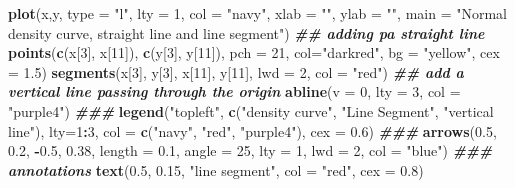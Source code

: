 \documentclass[
]{book}
\newenvironment{Shaded}{\begin{snugshade}}{\end{snugshade}}
\newcommand{\AttributeTok}[1]{\textcolor[rgb]{0.13,0.29,0.53}{#1}}
\newcommand{\DecValTok}[1]{\textcolor[rgb]{0.00,0.00,0.81}{#1}}
\newcommand{\DocumentationTok}[1]{\textcolor[rgb]{0.56,0.35,0.01}{\textbf{\textit{#1}}}}
\newcommand{\FloatTok}[1]{\textcolor[rgb]{0.00,0.00,0.81}{#1}}
\newcommand{\FunctionTok}[1]{\textcolor[rgb]{0.13,0.29,0.53}{\textbf{#1}}}
\newcommand{\NormalTok}[1]{#1}
\newcommand{\SpecialCharTok}[1]{\textcolor[rgb]{0.81,0.36,0.00}{\textbf{#1}}}
\newcommand{\StringTok}[1]{\textcolor[rgb]{0.31,0.60,0.02}{#1}}
\begin{document}
\begin{Shaded}
\begin{Highlighting}[]
\FunctionTok{plot}\NormalTok{(x,y, }\AttributeTok{type =} \StringTok{"l"}\NormalTok{, }\AttributeTok{lty =} \DecValTok{1}\NormalTok{, }\AttributeTok{col =} \StringTok{"navy"}\NormalTok{, }\AttributeTok{xlab =} \StringTok{""}\NormalTok{, }\AttributeTok{ylab =} \StringTok{""}\NormalTok{,}
     \AttributeTok{main =} \StringTok{"Normal density curve, straight line and line segment"}\NormalTok{)}
\DocumentationTok{\#\# adding pa straight line}
\FunctionTok{points}\NormalTok{(}\FunctionTok{c}\NormalTok{(x[}\DecValTok{3}\NormalTok{], x[}\DecValTok{11}\NormalTok{]), }\FunctionTok{c}\NormalTok{(y[}\DecValTok{3}\NormalTok{], y[}\DecValTok{11}\NormalTok{]), }\AttributeTok{pch =} \DecValTok{21}\NormalTok{, }\AttributeTok{col=}\StringTok{"darkred"}\NormalTok{, }\AttributeTok{bg =} \StringTok{"yellow"}\NormalTok{, }\AttributeTok{cex =} \FloatTok{1.5}\NormalTok{)}
\FunctionTok{segments}\NormalTok{(x[}\DecValTok{3}\NormalTok{], y[}\DecValTok{3}\NormalTok{], x[}\DecValTok{11}\NormalTok{], y[}\DecValTok{11}\NormalTok{], }\AttributeTok{lwd =} \DecValTok{2}\NormalTok{, }\AttributeTok{col =} \StringTok{"red"}\NormalTok{)}
\DocumentationTok{\#\# add a vertical line passing through the origin}
\FunctionTok{abline}\NormalTok{(}\AttributeTok{v =} \DecValTok{0}\NormalTok{, }\AttributeTok{lty =} \DecValTok{3}\NormalTok{, }\AttributeTok{col =} \StringTok{"purple4"}\NormalTok{)}
\DocumentationTok{\#\#\#}
\FunctionTok{legend}\NormalTok{(}\StringTok{"topleft"}\NormalTok{, }\FunctionTok{c}\NormalTok{(}\StringTok{"density curve"}\NormalTok{, }\StringTok{"Line Segment"}\NormalTok{, }\StringTok{"vertical line"}\NormalTok{), }\AttributeTok{lty=}\DecValTok{1}\SpecialCharTok{:}\DecValTok{3}\NormalTok{, }\AttributeTok{col =} \FunctionTok{c}\NormalTok{(}\StringTok{"navy"}\NormalTok{, }\StringTok{"red"}\NormalTok{, }\StringTok{"purple4"}\NormalTok{), }\AttributeTok{cex =} \FloatTok{0.6}\NormalTok{)}
\DocumentationTok{\#\#\#}
\FunctionTok{arrows}\NormalTok{(}\FloatTok{0.5}\NormalTok{, }\FloatTok{0.2}\NormalTok{, }\SpecialCharTok{{-}}\FloatTok{0.5}\NormalTok{, }\FloatTok{0.38}\NormalTok{,  }\AttributeTok{length =} \FloatTok{0.1}\NormalTok{, }\AttributeTok{angle =} \DecValTok{25}\NormalTok{, }\AttributeTok{lty =} \DecValTok{1}\NormalTok{, }\AttributeTok{lwd =} \DecValTok{2}\NormalTok{, }\AttributeTok{col =} \StringTok{"blue"}\NormalTok{)}
\DocumentationTok{\#\#\# annotations}
\FunctionTok{text}\NormalTok{(}\FloatTok{0.5}\NormalTok{, }\FloatTok{0.15}\NormalTok{, }\StringTok{"line segment"}\NormalTok{, }\AttributeTok{col =} \StringTok{"red"}\NormalTok{, }\AttributeTok{cex =} \FloatTok{0.8}\NormalTok{)}
\end{Highlighting}
\end{Shaded}
\end{document}
